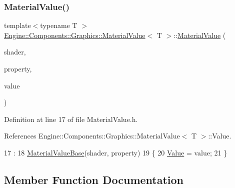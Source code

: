 \subsubsection{\texorpdfstring{Material\+Value()}{MaterialValue()}}
{\footnotesize\ttfamily template$<$typename T $>$ \\
\mbox{\hyperlink{classEngine_1_1Components_1_1Graphics_1_1MaterialValue}{Engine\+::\+Components\+::\+Graphics\+::\+Material\+Value}}$<$ T $>$\+::\mbox{\hyperlink{classEngine_1_1Components_1_1Graphics_1_1MaterialValue}{Material\+Value}} (\begin{DoxyParamCaption}\item[{\mbox{\hyperlink{classEngine_1_1Components_1_1Graphics_1_1Shader}{Graphics\+::\+Shader}} $\ast$}]{shader,  }\item[{const G\+Lchar $\ast$}]{property,  }\item[{T $\ast$}]{value }\end{DoxyParamCaption})\hspace{0.3cm}{\ttfamily [inline]}}



Definition at line 17 of file Material\+Value.\+h.



References Engine\+::\+Components\+::\+Graphics\+::\+Material\+Value$<$ T $>$\+::\+Value.


\begin{DoxyCode}
17                                                                                         :
18                     \mbox{\hyperlink{classEngine_1_1Components_1_1Graphics_1_1MaterialValueBase_aec4518ee9e8635ab6639609c92d0f89d}{MaterialValueBase}}(shader, property)
19                 \{
20                     \mbox{\hyperlink{classEngine_1_1Components_1_1Graphics_1_1MaterialValue_a1fbe4d2c3c1cf6c1538cf0012a78cb6e}{Value}} = value;
21                 \}
\end{DoxyCode}


\subsection{Member Function Documentation}
\mbox{\label{classEngine_1_1Components_1_1Graphics_1_1MaterialValue_a88dbac3446bf9e78c7411e79c1b58977}} 
